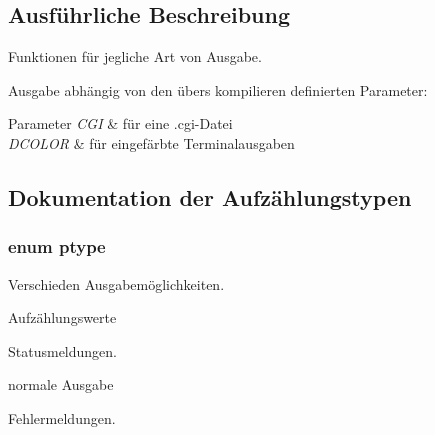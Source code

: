 \subsection{Ausführliche Beschreibung}
Funktionen für jegliche Art von Ausgabe. 

Ausgabe abhängig von den übers kompilieren definierten Parameter\+: 
\begin{DoxyParams}{Parameter}
{\em C\+GI} & für eine .cgi-\/\+Datei \\
\hline
{\em D\+C\+O\+L\+OR} & für eingefärbte Terminalausgaben \\
\hline
\end{DoxyParams}


\subsection{Dokumentation der Aufzählungstypen}
\subsubsection[{\texorpdfstring{ptype}{ptype}}]{\setlength{\rightskip}{0pt plus 5cm}enum {\bf ptype}}\hypertarget{group___lend_lib_out_ga0916607956575302a93dbd21440edc1a}{}\label{group___lend_lib_out_ga0916607956575302a93dbd21440edc1a}


Verschieden Ausgabemöglichkeiten. 

\begin{Desc}
\item[Aufzählungswerte]\par
\begin{description}
\item[{\em 
status\hypertarget{group___lend_lib_out_gga0916607956575302a93dbd21440edc1aa9a6940c3bba41cdd6dacae1a00176a30}{}\label{group___lend_lib_out_gga0916607956575302a93dbd21440edc1aa9a6940c3bba41cdd6dacae1a00176a30}
}]Statusmeldungen. \item[{\em 
out\hypertarget{group___lend_lib_out_gga0916607956575302a93dbd21440edc1aaaca14bf8f96bb2b357f12496b7f11579}{}\label{group___lend_lib_out_gga0916607956575302a93dbd21440edc1aaaca14bf8f96bb2b357f12496b7f11579}
}]normale Ausgabe \item[{\em 
error\hypertarget{group___lend_lib_out_gga0916607956575302a93dbd21440edc1aad606e435413ea0944dd00d49e901e4ed}{}\label{group___lend_lib_out_gga0916607956575302a93dbd21440edc1aad606e435413ea0944dd00d49e901e4ed}
}]Fehlermeldungen. \end{description}
\end{Desc}


